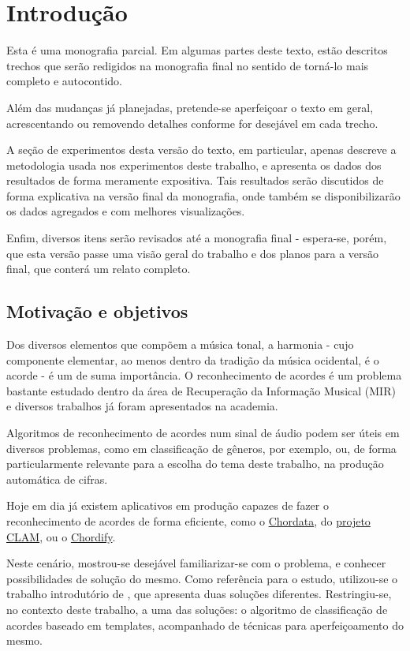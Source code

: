 \chapter{Introdução}
\label{cap:introducao}
    Esta é uma monografia parcial. Em algumas partes deste texto, estão descritos trechos que serão redigidos na monografia final no sentido de torná-lo mais completo e autocontido.
    
    Além das mudanças já planejadas, pretende-se aperfeiçoar o texto em geral, acrescentando ou removendo detalhes conforme for desejável em cada trecho.
    
    A seção de experimentos desta versão do texto, em particular, apenas descreve a metodologia usada nos experimentos deste trabalho, e apresenta os dados dos resultados de forma meramente expositiva. Tais resultados serão discutidos de forma explicativa na versão final da monografia, onde também se disponibilizarão os dados agregados e com melhores visualizações.
    
    Enfim, diversos itens serão revisados até a monografia final - espera-se, porém, que esta versão passe uma visão geral do trabalho e dos planos para a versão final, que conterá um relato completo.

\section{Motivação e objetivos}
    Dos diversos elementos que compõem a música tonal, a harmonia - cujo componente elementar, ao menos dentro da tradição da música ocidental, é o acorde - é um de suma importância. O reconhecimento de acordes é um problema bastante estudado dentro da área de Recuperação da Informação Musical (MIR) e diversos trabalhos já foram apresentados na academia.
    
    Algoritmos de reconhecimento de acordes num sinal de áudio podem ser úteis em diversos problemas, como em classificação de gêneros, por exemplo, ou, de forma particularmente relevante para a escolha do tema deste trabalho, na produção automática de cifras.
    
    Hoje em dia já existem aplicativos em produção capazes de fazer o reconhecimento de acordes de forma eficiente, como o \href{http://clam-project.org/wiki/Chordata_tutorial}{Chordata}, do \href{http://clam-project.org/index.html}{projeto CLAM}, ou o \href{https://chordify.net/}{Chordify}.
    
    Neste cenário, mostrou-se desejável familiarizar-se com o problema, e conhecer possibilidades de solução do mesmo. Como referência para o estudo, utilizou-se o trabalho introdutório de \cite{muller}, que apresenta duas soluções diferentes. Restringiu-se, no contexto deste trabalho, a uma das soluções: o algoritmo de classificação de acordes baseado em templates, acompanhado de técnicas para aperfeiçoamento do mesmo.

